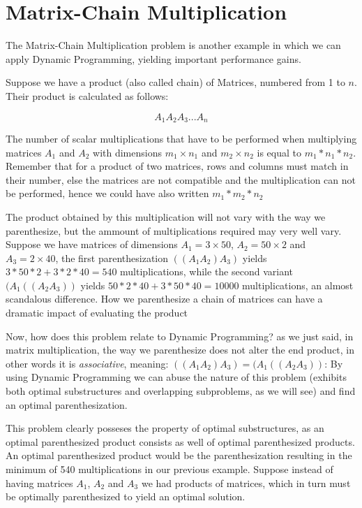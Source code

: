 \section{Matrix-Chain Multiplication}

The Matrix-Chain Multiplication problem is another example in which we can 
apply Dynamic Programming, yielding important performance gains.

Suppose we have a product (also called chain) of Matrices, numbered from 1 to $n$. Their product is
calculated as follows:

$$A_1A_2A_3...A_n$$

The number of scalar multiplications that have to be performed when multiplying matrices $A_1$
and $A_2$ with dimensions $m_1 \times n_1$ and $m_2\times n_2$ is equal to $m_1*n_1*n_2$. Remember that
for a product of two matrices, rows and columns must match in their number, else the matrices are not 
compatible and the multiplication can not be performed, hence we could have also written $m_1*m_2*n_2$

The product obtained by this multiplication will not vary with the way we parenthesize,
but the ammount of multiplications required may very well vary. Suppose we have
matrices of dimensions $A_1 = 3 \times 50$, $A_2 = 50 \times 2$ and $A_3 = 2 \times 40$, 
the first parenthesization $((A_1A_2)A_3)$ yields $3*50*2 + 3*2*40 = 540$
multiplications, while the second variant $(A_1((A_2A_3))$ yields 
$50*2*40 + 3*50*40 = 10000$ multiplications, an almost scandalous difference.
How we parenthesize a chain of matrices can have a dramatic impact of evaluating
the product \cite{cormen2009introduction}

Now, how does this problem relate to Dynamic Programming? as we just said, in matrix 
multiplication, the way we parenthesize does not alter the end product, in other words it is
\emph{associative}, meaning:  $((A_1A_2)A_3) = (A_1((A_2A_3))$: By using Dynamic Programming
we can abuse the nature of this problem (exhibits both optimal substructures and
overlapping subproblems, as we will see) and find an optimal parenthesization.

This problem clearly posseses the property of optimal substructures, as an optimal 
parenthesized product consists as well of optimal parenthesized products. An optimal
parenthesized product would be the parenthesization resulting in the minimum of 540
multiplications in our previous example. Suppose instead of having matrices $A_1$, 
$A_2$ and $A_3$ we had products of matrices, which in turn must be optimally parenthesized
to yield an optimal solution.

